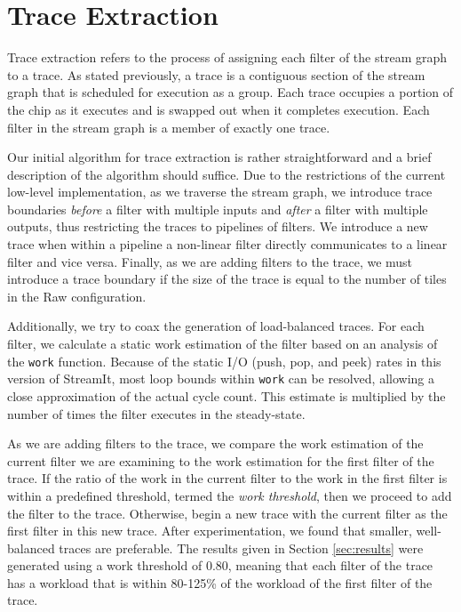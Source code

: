 \section{Trace Extraction}

\label{sec:extraction}	
Trace extraction refers to the process of assigning each filter of the
stream graph to a trace.  As stated previously, a trace is a
contiguous section of the stream graph that is scheduled for execution
as a group. Each trace occupies a portion of the chip as it executes
and is swapped out when it completes execution.  Each filter in the
stream graph is a member of exactly one trace.

Our initial algorithm for trace extraction is rather straightforward
and a brief description of the algorithm should suffice.  Due to the
restrictions of the current low-level implementation, as we traverse
the stream graph, we introduce trace boundaries {\it before} a filter
with multiple inputs and {\it after} a filter with multiple outputs,
thus restricting the traces to pipelines of filters. We introduce a
new trace when within a pipeline a non-linear filter directly
communicates to a linear filter and vice versa. Finally, as we are
adding filters to the trace, we must introduce a trace boundary if the
size of the trace is equal to the number of tiles in the Raw
configuration.


Additionally, we try to coax the generation of load-balanced traces.
For each filter, we calculate a static work estimation of the filter
based on an analysis of the {\tt work} function.  Because of the
static I/O (push, pop, and peek) rates in this version of StreamIt,
most loop bounds within {\tt work} can be resolved, allowing a close
approximation of the actual cycle count.  This estimate is multiplied
by the number of times the filter executes in the steady-state.

As we are adding filters to the trace, we compare the work estimation
of the current filter we are examining to the work estimation for the
first filter of the trace.  If the ratio of the work in the current
filter to the work in the first filter is within a predefined
threshold, termed the {\it work threshold}, then we proceed to add the
filter to the trace.  Otherwise, begin a new trace with the current
filter as the first filter in this new trace.  After experimentation,
we found that smaller, well-balanced traces are preferable.  The
results given in Section \ref{sec:results} were generated using a work
threshold of 0.80, meaning that each filter of the trace has a
workload that is within 80-125\% of the workload of the first filter
of the trace.

